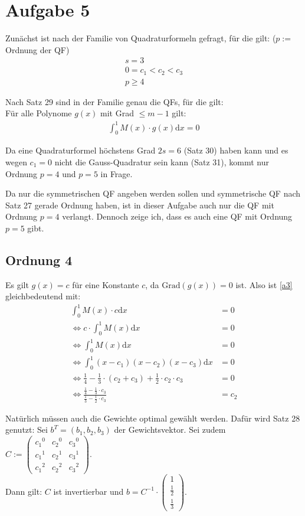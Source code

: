 \section*{Aufgabe 5}

Zunächst ist nach der Familie von Quadraturformeln gefragt, für die gilt: ($p := $ Ordnung der QF)
\begin{align}
	s = 3 \\
	0 = c_1 < c_2 < c_3 \\
	p \ge 4
\end{align}

Nach Satz 29 sind in der Familie genau die QFs, für die gilt: \\
Für alle Polynome $g(x)$ mit Grad $\le m-1$ gilt:
\begin{align}
	 \int_0^1 M(x) \cdot g(x) \mathrm{d}x = 0 \label{a3}
\end{align}

Da eine Quadraturformel höchstens Grad $2s=6$ (Satz 30) haben kann und es wegen
$c_1 = 0$ nicht die Gauss-Quadratur sein kann (Satz 31), kommt nur Ordnung $p=4$
und $p=5$ in Frage.

Da nur die symmetrischen QF angeben werden sollen und symmetrische
QF nach Satz 27 gerade Ordnung haben, ist in dieser Aufgabe 
auch nur die QF mit Ordnung $p=4$ verlangt. Dennoch zeige ich,
dass es auch eine QF mit Ordnung $p=5$ gibt.

\subsection*{Ordnung 4}
Es gilt $g(x) = c$ für eine Konstante $c$, da $\text{Grad}(g(x))=0$ ist. 
Also ist \ref{a3} gleichbedeutend mit:
\begin{align}
	 \int_0^1 M(x) \cdot c \mathrm{d}x &= 0 \\
	 \Leftrightarrow c \cdot \int_0^1 M(x) \mathrm{d}x &= 0 \\
 	 \Leftrightarrow \int_0^1 M(x) \mathrm{d}x &= 0 \\
 	 \Leftrightarrow \int_0^1 (x-c_1)(x-c_2)(x-c_3) \mathrm{d}x &= 0 \\
 	 \Leftrightarrow \frac{1}{4} - \frac{1}{3} \cdot (c_2 + c_3) + \frac{1}{2} \cdot c_2 \cdot c_3 &= 0 \\
 	 \Leftrightarrow \frac{\frac{1}{4} - \frac{1}{3} \cdot c_3}
 	                      {\frac{1}{3} - \frac{1}{2} \cdot c_3} &= c_2
\end{align}

Natürlich müssen auch die Gewichte optimal gewählt werden. Dafür wird Satz 28 genutzt:
Sei $b^T = (b_1, b_2, b_3)$ der Gewichtsvektor. Sei zudem $C :=
\begin{pmatrix}
    {c_1}^0 & {c_2}^0 & {c_3}^0 \\
    {c_1}^1 & {c_2}^1 & {c_3}^1 \\
    {c_1}^2 & {c_2}^2 & {c_3}^2
\end{pmatrix}
$. \\
Dann gilt: $C$ ist invertierbar und $b = C^{-1} \cdot
\begin{pmatrix}
    1 \\
    \frac{1}{2} \\
    \frac{1}{3}
\end{pmatrix}
$.

